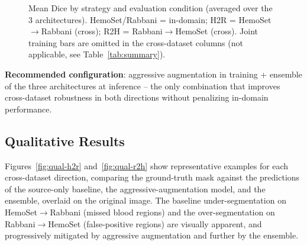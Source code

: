 \documentclass[10pt,conference]{IEEEtran}
\begin{document}
\begin{figure}[t]
\centering
{}
\caption{Mean Dice by strategy and evaluation condition (averaged over the 3 architectures). HemoSet/Rabbani = in-domain; H2R = HemoSet$\to$Rabbani (cross); R2H = Rabbani$\to$HemoSet (cross). Joint training bars are omitted in the cross-dataset columns (not applicable, see Table~\ref{tab:summary}).}
\label{fig:chart}
\end{figure}

\textbf{Recommended configuration}: aggressive augmentation in training + ensemble of the three architectures at inference -- the only combination that improves cross-dataset robustness in both directions without penalizing in-domain performance.

\subsection{Qualitative Results}
\label{sec:qualitative}

Figures~\ref{fig:qual-h2r} and~\ref{fig:qual-r2h} show representative examples for each cross-dataset direction, comparing the ground-truth mask against the predictions of the source-only baseline, the aggressive-augmentation model, and the ensemble, overlaid on the original image. The baseline under-segmentation on HemoSet$\rightarrow$Rabbani (missed blood regions) and the over-segmentation on Rabbani$\rightarrow$HemoSet (false-positive regions) are visually apparent, and progressively mitigated by aggressive augmentation and further by the ensemble.
\end{document}

